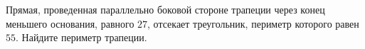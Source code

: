 \begin{ex}
	\begin{condition}
		Прямая, проведенная параллельно боковой стороне трапеции через конец меньшего основания, равного \( 27 \), отсекает треугольник, периметр которого равен \( 55 \). Найдите периметр трапеции.
	\end{condition}
\end{ex}